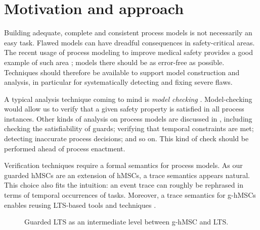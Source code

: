 \section{Motivation and approach\label{section:deductive-motivation}}

Building adequate, complete and consistent process models is not necessarily an easy task. Flawed models can have dreadful consequences in safety-critical areas. The recent usage of process modeling to improve medical safety provides a good example of such area \cite{Clarke:2008, Grando:2009, Damas:2011}; models there should be as error-free as possible. Techniques should therefore be available to support model construction and analysis, in particular for systematically detecting and fixing severe flaws.

A typical analysis technique coming to mind is \emph{model checking} \cite{Clarke:1989}. Model-checking would allow us to verify that a given safety property is satisfied in all process instances. Other kinds of analysis on process models are discussed in \cite{Damas:2011}, including checking the satisfiability of guards; verifying that temporal constraints are met; detecting inaccurate process decisions; and so on. This kind of check should be performed ahead of process enactment.

Verification techniques require a formal semantics for process models. As our guarded hMSCs are an extension of hMSCs, a trace semantics appears natural. This choice also fits the intuition: an event trace can roughly be rephrased in terms of temporal occurrences of tasks. Moreover, a trace semantics for g-hMSCs enables reusing LTS-based tools and techniques \cite{Magee:1999, Giannakopoulou:2003}.

\begin{figure}\centering
{}
\caption{Guarded LTS as an intermediate level between g-hMSC and LTS.\label{image:deductive-chapter-overview}}
\end{figure}

